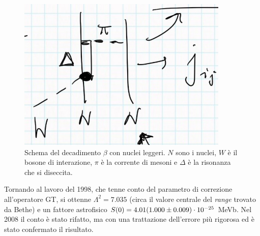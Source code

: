 \begin{figure}[h]
    \centering
    \includegraphics[scale=0.5]{Immagini/0331_GT.png}
    \caption{Schema del decadimento $\beta$ con nuclei leggeri. $N$ sono i nuclei, $W$ è il bosone di interazione, $\pi$ è la corrente di mesoni e $\Delta$ è la risonanza che si diseccita.}%
    \label{0331_MEC}
\end{figure}
\newline
\noindent Tornando al lavoro del 1998, che tenne conto del parametro di correzione all'operatore GT, si ottenne $\Lambda^2 = 7.035$ (circa il valore centrale del \textit{range} trovato da Bethe) e un fattore astrofisico $S(0) = 4.01 (1.000\pm0.009)\cdot10^{-25}$ MeVb. Nel 2008 il conto è stato rifatto, ma con una trattazione dell'errore più rigorosa ed è stato confermato il risultato.
